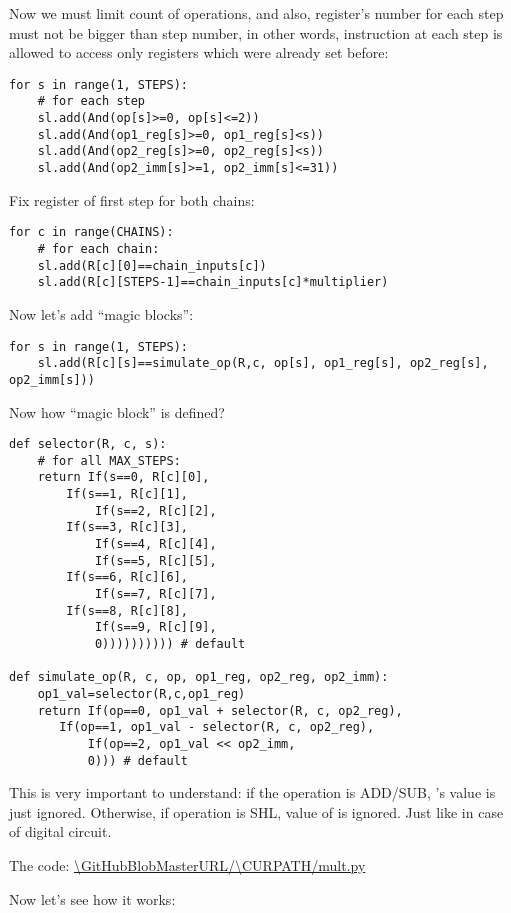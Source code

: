 Now we must limit count of operations, and also, register's number for each step must not be bigger than step number,
in other words, instruction at each step is allowed to access only registers which were already set before:

\begin{lstlisting}
for s in range(1, STEPS):
    # for each step
    sl.add(And(op[s]>=0, op[s]<=2))
    sl.add(And(op1_reg[s]>=0, op1_reg[s]<s))
    sl.add(And(op2_reg[s]>=0, op2_reg[s]<s))
    sl.add(And(op2_imm[s]>=1, op2_imm[s]<=31))
\end{lstlisting}

Fix register of first step for both chains:

\begin{lstlisting}
for c in range(CHAINS):
    # for each chain:
    sl.add(R[c][0]==chain_inputs[c])
    sl.add(R[c][STEPS-1]==chain_inputs[c]*multiplier)
\end{lstlisting}

Now let's add ``magic blocks'':

\begin{lstlisting}
for s in range(1, STEPS):
    sl.add(R[c][s]==simulate_op(R,c, op[s], op1_reg[s], op2_reg[s], op2_imm[s]))
\end{lstlisting}

Now how ``magic block'' is defined?

\begin{lstlisting}
def selector(R, c, s):
    # for all MAX_STEPS:
    return If(s==0, R[c][0],
	    If(s==1, R[c][1],
            If(s==2, R[c][2],
	    If(s==3, R[c][3],
            If(s==4, R[c][4],
            If(s==5, R[c][5],
	    If(s==6, R[c][6],
            If(s==7, R[c][7],
	    If(s==8, R[c][8],
            If(s==9, R[c][9],
	        0)))))))))) # default

def simulate_op(R, c, op, op1_reg, op2_reg, op2_imm):
    op1_val=selector(R,c,op1_reg)
    return If(op==0, op1_val + selector(R, c, op2_reg),
	   If(op==1, op1_val - selector(R, c, op2_reg),
           If(op==2, op1_val << op2_imm,
	       0))) # default
\end{lstlisting}

This is very important to understand: if the operation is ADD/SUB, 's value is just ignored.
Otherwise, if operation is SHL, value of  is ignored.
Just like in case of digital circuit.

The code: \url{\GitHubBlobMasterURL/\CURPATH/mult.py}

Now let's see how it works:

